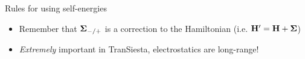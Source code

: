 \begin{frame}
\begin{block}{Rules for using self-energies}
\begin{center}
    \end{center}

    \vspace{-12pt}

    \begin{itemize}
      \item<+-> Remember that $\boldsymbol{\Sigma}_{-/+}$ is a correction to the Hamiltonian (i.e. 
      $\mathbf{H}' = \mathbf{H} + \boldsymbol{\Sigma}$)

      \item \emph{Extremely} important in TranSiesta, electrostatics are long-range!
    \end{itemize}
  \end{block}


    

\end{frame}


